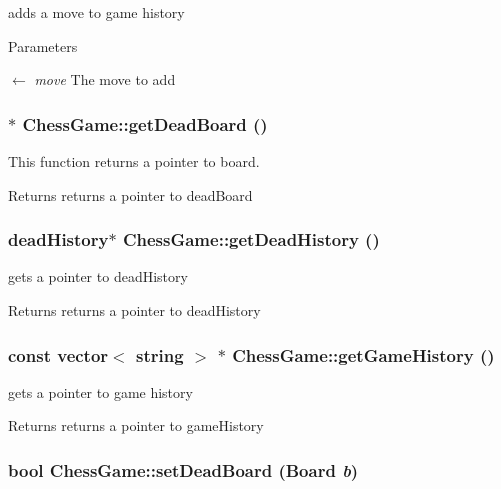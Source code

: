 adds a move to game history 
\begin{DoxyParams}{Parameters}
\item[\mbox{$\leftarrow$} {\em move}]The move to add \end{DoxyParams}
\hypertarget{classChessGame_aae64a8ad5e54881d22d17a63cbc3159d}{
\subsubsection[{getDeadBoard}]{ $\ast$ ChessGame::getDeadBoard ()}}
\label{classChessGame_aae64a8ad5e54881d22d17a63cbc3159d}


This function returns a pointer to board. \begin{DoxyReturn}{Returns}
returns a pointer to deadBoard 
\end{DoxyReturn}
\hypertarget{classChessGame_a60066cc951dc9fa90e850dc8b57ab210}{
\subsubsection[{getDeadHistory}]{\setlength{\rightskip}{0pt plus 5cm}deadHistory$\ast$ ChessGame::getDeadHistory ()}}
\label{classChessGame_a60066cc951dc9fa90e850dc8b57ab210}


gets a pointer to deadHistory \begin{DoxyReturn}{Returns}
returns a pointer to deadHistory 
\end{DoxyReturn}
\hypertarget{classChessGame_a4a6bd9631a46b9f59b6d1b619e743a1a}{
\subsubsection[{getGameHistory}]{\setlength{\rightskip}{0pt plus 5cm}const vector$<$ string $>$ $\ast$ ChessGame::getGameHistory ()}}
\label{classChessGame_a4a6bd9631a46b9f59b6d1b619e743a1a}


gets a pointer to game history \begin{DoxyReturn}{Returns}
returns a pointer to gameHistory 
\end{DoxyReturn}
\hypertarget{classChessGame_af39a867cb667ca6befdab8cddb48ea3e}{
\subsubsection[{setDeadBoard}]{\setlength{\rightskip}{0pt plus 5cm}bool ChessGame::setDeadBoard ({\bf Board} {\em b})}}
\label{classChessGame_af39a867cb667ca6befdab8cddb48ea3e}


